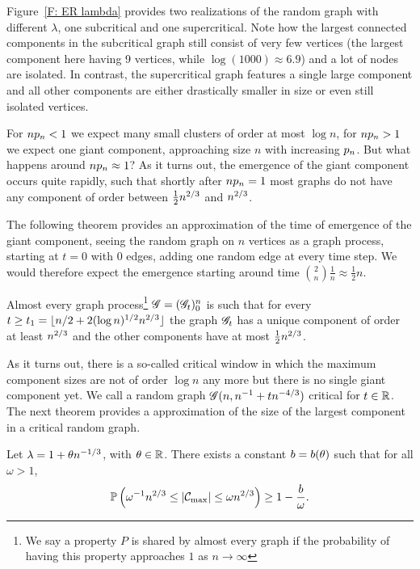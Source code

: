 Figure~\ref{F: ER lambda} provides two realizations of the random graph with different $\lambda$,
one subcritical and one supercritical.
Note how the largest connected components in the subcritical graph still consist of very few vertices
(the largest component here having 9 vertices, while $\log(1000) \approx 6.9$)
and a lot of nodes are isolated.
In contrast, the supercritical graph features a single large component 
and all other components are either drastically smaller in size or even still isolated vertices.

For $n p_n < 1$ we expect many small clusters of order at most $\log n$,
for $n p_n > 1$ we expect one giant component, approaching size $n$ with increasing $p_n$.
But what happens around $n p_n \approx 1$?
As it turns out, the emergence of the giant component occurs quite rapidly,
such that shortly after $n p_n = 1$ most graphs do not have any component of order between $\frac{1}{2}n^{2 / 3}$ and $n^{2 / 3}$.

The following theorem provides an approximation of the time of emergence of the giant component,
seeing the random graph on $n$ vertices as a graph process,
starting at $t=0$ with $0$ edges, adding one random edge at every time step.
We would therefore expect the emergence starting around time $\binom{2}{n}\frac{1}{n} \approx \frac{1}{2}n$. 

\begin{theorem}
	Almost every graph process\footnote{%
		We say a property $P$ is shared by almost every graph if the probability of having this property approaches $1$ as $n \rightarrow \infty$} 
	$\mathscr{G} = (\mathscr{G}_t)_0^n$ is such that 
	for every $t \geq t_1 = \lfloor n/2 + 2(\log n)^{1/2}n^{2 / 3} \rfloor$ 
	the graph $\mathscr{G}_t$ has a unique component of order at least $n^{2 / 3}$ and the other components have at most $\frac{1}{2}n^{2 / 3}$.
\end{theorem}

As it turns out, there is a so-called critical window in which the maximum component sizes are not of order $\log n$ any more 
but there is no single giant component yet.
We call a random graph $\mathscr{G}(n, n^{-1} + tn^{-4 / 3})$ critical for $t \in \mathbb{R}$.
The next theorem provides a approximation of the size of the largest component in a critical random graph.

\begin{theorem} \label{T: largest critical cluster}
	Let $\lambda = 1 + \theta n^{-1 / 3}$, with $\theta \in \mathbb{R}$.
	There exists a constant $b = b(\theta)$ such that for all $\omega > 1$,
	\begin{equation}
		\mathbb{P}\left( \omega^{-1} n^{2 / 3} \leq |\mathcal{C}_{\max}| \leq \omega n^{2 / 3}\right) \geq 1 - \frac{b}{\omega}.
	\end{equation}	
\end{theorem}

